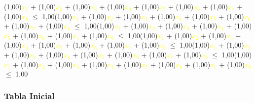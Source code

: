 \documentclass{beamer}
\newcommand\tab[1][1cm]{\hspace*{#1}}
\begin{document}
\begin{frame}\tab (1,00)\textcolor{yellow}{$x_{1}$} + (1,00)\textcolor{yellow}{$x_{2}$} + (1,00)\textcolor{yellow}{$x_{3}$} + (1,00)\textcolor{yellow}{$x_{4}$} + (1,00)\textcolor{yellow}{$x_{5}$} + (1,00)\textcolor{yellow}{$x_{6}$} + (1,00)\textcolor{yellow}{$x_{7}$} + (1,00)\textcolor{yellow}{$x_{8}$} $\leq$ 1,00\newline\newline\tab (1,00)\textcolor{yellow}{$x_{1}$} + (1,00)\textcolor{yellow}{$x_{2}$} + (1,00)\textcolor{yellow}{$x_{3}$} + (1,00)\textcolor{yellow}{$x_{4}$} + (1,00)\textcolor{yellow}{$x_{5}$} + (1,00)\textcolor{yellow}{$x_{6}$} + (1,00)\textcolor{yellow}{$x_{7}$} + (1,00)\textcolor{yellow}{$x_{8}$} $\leq$ 1,00\newline\newline\tab (1,00)\textcolor{yellow}{$x_{1}$} + (1,00)\textcolor{yellow}{$x_{2}$} + (1,00)\textcolor{yellow}{$x_{3}$} + (1,00)\textcolor{yellow}{$x_{4}$} + (1,00)\textcolor{yellow}{$x_{5}$} + (1,00)\textcolor{yellow}{$x_{6}$} + (1,00)\textcolor{yellow}{$x_{7}$} + (1,00)\textcolor{yellow}{$x_{8}$} $\leq$ 1,00\newline\newline\tab (1,00)\textcolor{yellow}{$x_{1}$} + (1,00)\textcolor{yellow}{$x_{2}$} + (1,00)\textcolor{yellow}{$x_{3}$} + (1,00)\textcolor{yellow}{$x_{4}$} + (1,00)\textcolor{yellow}{$x_{5}$} + (1,00)\textcolor{yellow}{$x_{6}$} + (1,00)\textcolor{yellow}{$x_{7}$} + (1,00)\textcolor{yellow}{$x_{8}$} $\leq$ 1,00\newline\newline\tab (1,00)\textcolor{yellow}{$x_{1}$} + (1,00)\textcolor{yellow}{$x_{2}$} + (1,00)\textcolor{yellow}{$x_{3}$} + (1,00)\textcolor{yellow}{$x_{4}$} + (1,00)\textcolor{yellow}{$x_{5}$} + (1,00)\textcolor{yellow}{$x_{6}$} + (1,00)\textcolor{yellow}{$x_{7}$} + (1,00)\textcolor{yellow}{$x_{8}$} $\leq$ 1,00\newline\newline\tab (1,00)\textcolor{yellow}{$x_{1}$} + (1,00)\textcolor{yellow}{$x_{2}$} + (1,00)\textcolor{yellow}{$x_{3}$} + (1,00)\textcolor{yellow}{$x_{4}$} + (1,00)\textcolor{yellow}{$x_{5}$} + (1,00)\textcolor{yellow}{$x_{6}$} + (1,00)\textcolor{yellow}{$x_{7}$} + (1,00)\textcolor{yellow}{$x_{8}$} $\leq$ 1,00\newline\newline\end{frame}\begin{frame}
\frametitle{Tabla Inicial}
{
\centering
\begin{tabu}{|@{}*{20}{p{1.0cm}@{}|}}

\end{tabu}}
\end{frame}
\end{document}
